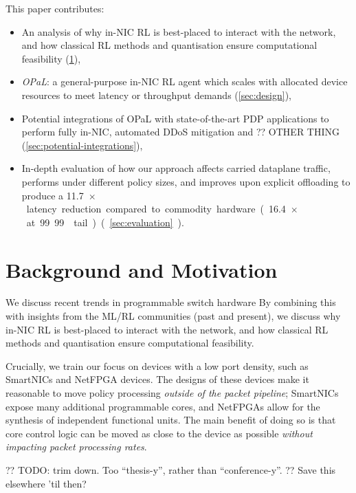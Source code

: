 \documentclass[sigconf,natbib=false]{acmart}
\newcommand{\approachshort}{OPaL}
\begin{document}
This paper contributes:
\begin{itemize}
	\item An analysis of why in-NIC RL is best-placed to interact with the network, and how classical RL methods and quantisation ensure computational feasibility (\cref{sec:motivation}),
	\item \emph{\approachshort{}}: a general-purpose in-NIC RL agent which scales with allocated device resources to meet latency or throughput demands (\cref{sec:design}),
	\item Potential integrations of \approachshort{} with state-of-the-art PDP applications to perform fully in-NIC, automated DDoS mitigation and ?? OTHER THING (\cref{sec:potential-integrations}),
	\item In-depth evaluation of how our approach affects carried dataplane traffic, performs under different policy sizes, and improves upon explicit offloading to produce a \SI{11.7}{$\times$} latency reduction compared to commodity hardware (\SI{16.4}{$\times$} at 99.99 tail) (\cref{sec:evaluation}).
\end{itemize}

\section{Background and Motivation}\label{sec:motivation}
We discuss recent trends in programmable switch hardware
By combining this with insights from the ML/RL communities (past and present), we discuss why in-NIC RL is best-placed to interact with the network, and how classical RL methods and quantisation ensure computational feasibility.

Crucially, we train our focus on devices with a low port density, such as SmartNICs and NetFPGA devices.
The designs of these devices make it reasonable to move policy processing \emph{outside of the packet pipeline}; SmartNICs expose many additional programmable cores, and NetFPGAs allow for the synthesis of independent functional units.
The main benefit of doing so is that core control logic can be moved as close to the device as possible \emph{without impacting packet processing rates}.

?? TODO: trim down. Too ``thesis-y'', rather than ``conference-y''.
?? Save this elsewhere 'til then?
\end{document}
